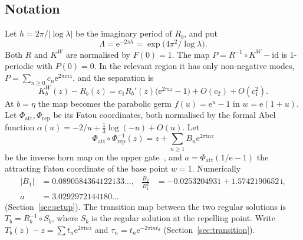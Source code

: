 \documentclass[11pt]{amsart}
\theoremstyle{definition}
\newcommand{\Rr}{R}
\newcommand{\Kk}{K}
\newcommand{\eee}{\mathrm{e}}
\newcommand{\ii}{\mathrm{i}}
\begin{document}
\subsection*{Notation}
Let $h=2\pi/|\log\lambda|$ be the imaginary period of $\Rr_b$, and put
\[
 \Lambda=\eee^{-2\pi h}=\exp\bigl(4\pi^2/\log\lambda\bigr).
\]
Both $\Rr$ and $\Kk^W$ are normalised by $F(0)=1$.  The map
$P=\Rr^{-1}\circ\Kk^W-\mathrm{id}$
is $1$-periodic with $P(0)=0$.  In the relevant region it has only
non-negative modes, $P=\sum_{n\ge0}c_n\eee^{2\pi\ii nz}$, and the separation is
\[
 \Kk^W_b(z)-\Rr_b(z)=c_1\Rr_b'(z)\bigl(\eee^{2\pi\ii z}-1\bigr)+O(c_2)+O(c_1^2).
\]
At $b=\eta$ the map becomes the parabolic germ $f(u)=\eee^u-1$ in
$w=\eee(1+u)$.  Let $\Phi_{\mathrm{att}},\Phi_{\mathrm{rep}}$ be its Fatou
coordinates, both normalised by the formal Abel function
$\alpha(u)=-2/u+\tfrac13\log(-u)+O(u)$.  Let
\[
 \Phi_{\mathrm{att}}\circ\Phi_{\mathrm{rep}}^{-1}(z)=z+\sum_{n\ge1}B_n\eee^{2\pi\ii nz}
\]
be the inverse horn map on the upper gate~\cite{Ecalle1981,Voronin1981}, and $a=\Phi_{\mathrm{att}}(1/\eee-1)$
the attracting Fatou coordinate of the base point $w=1$.  Numerically
\[
 \begin{aligned}
 |B_1|&=0.0890584364122133\ldots, &
 \frac{B_2}{B_1^2}&=-0.0253204931+1.5742190652\,\ii,\\
 a&=3.0292972144180\ldots
 \end{aligned}
\]
(Section~\ref{sec:setup}).  The transition map between the two regular
solutions is $T_b=\Rr_b^{-1}\circ S_b$, where $S_b$ is the regular solution at
the repelling point.  Write $T_b(z)-z=\sum t_n\eee^{2\pi\ii nz}$ and
$\tau_n=t_n\eee^{-2\pi\ii nt_0}$ (Section~\ref{sec:transition}).
\end{document}
